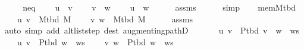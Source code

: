 \begin{isabellebody}
\endisataginvisible
{\isafoldinvisible}%
%
\isadeliminvisible
\isanewline
%
\endisadeliminvisible
%
\isadelimproof
%
\endisadelimproof
%
\isatagproof
{}\isamarkupfalse%
\ {\isacharminus}{\kern0pt}\isanewline
\ \ \isamarkupfalse%
\ neq{\isacharcolon}{\kern0pt}\isanewline
\ \ \ \ {\isachardoublequoteopen}u\ {\isasymnoteq}\ v{\isachardoublequoteclose}\isanewline
\ \ \ \ {\isachardoublequoteopen}v\ {\isasymnoteq}\ w{\isachardoublequoteclose}\isanewline
\ \ \ \ {\isachardoublequoteopen}u\ {\isasymnoteq}\ w{\isachardoublequoteclose}\isanewline
\ \ \ \ \isamarkupfalse%
\ assms{\isacharparenleft}{\kern0pt}{}{\isacharparenright}{\kern0pt}\isanewline
\ \ \ \ \isamarkupfalse%
\ simp{\isacharplus}{\kern0pt}\isanewline
\ \ \isamarkupfalse%
\ mem{\isacharunderscore}{\kern0pt}M{\isacharunderscore}{\kern0pt}tbd{\isacharcolon}{\kern0pt}\isanewline
\ \ \ \ {\isachardoublequoteopen}{\isacharbraceleft}{\kern0pt}u{\isacharcomma}{\kern0pt}\ v{\isacharbraceright}{\kern0pt}\ {\isasymnotin}\ M{\isacharunderscore}{\kern0pt}tbd\ M{\isachardoublequoteclose}\isanewline
\ \ \ \ {\isachardoublequoteopen}{\isacharbraceleft}{\kern0pt}v{\isacharcomma}{\kern0pt}\ w{\isacharbraceright}{\kern0pt}\ {\isasymin}\ M{\isacharunderscore}{\kern0pt}tbd\ M{\isachardoublequoteclose}\isanewline
\ \ \ \ \isamarkupfalse%
\ assms{\isacharparenleft}{\kern0pt}{}{\isacharparenright}{\kern0pt}\isanewline
\ \ \ \ \isamarkupfalse%
\ {\isacharparenleft}{\kern0pt}auto\ simp\ add{\isacharcolon}{\kern0pt}\ alt{\isacharunderscore}{\kern0pt}list{\isacharunderscore}{\kern0pt}step\ dest{\isacharcolon}{\kern0pt}\ augmenting{\isacharunderscore}{\kern0pt}pathD{\isacharparenleft}{\kern0pt}{}{\isacharparenright}{\kern0pt}{\isacharparenright}{\kern0pt}\isanewline
\ \ \isamarkupfalse%
\isanewline
\ \ \ \ {\isachardoublequoteopen}{\isacharbraceleft}{\kern0pt}u{\isacharcomma}{\kern0pt}\ v{\isacharbraceright}{\kern0pt}\ {\isasymnotin}\ P{\isacharunderscore}{\kern0pt}tbd\ {\isacharparenleft}{\kern0pt}v\ {\isacharhash}{\kern0pt}\ w\ {\isacharhash}{\kern0pt}\ ws{\isacharparenright}{\kern0pt}{\isachardoublequoteclose}\isanewline
\ \ \ \ {\isachardoublequoteopen}{\isacharbraceleft}{\kern0pt}u{\isacharcomma}{\kern0pt}\ v{\isacharbraceright}{\kern0pt}\ {\isasymnotin}\ P{\isacharunderscore}{\kern0pt}tbd\ {\isacharparenleft}{\kern0pt}w\ {\isacharhash}{\kern0pt}\ ws{\isacharparenright}{\kern0pt}{\isachardoublequoteclose}\isanewline
\ \ \ \ {\isachardoublequoteopen}{\isacharbraceleft}{\kern0pt}v{\isacharcomma}{\kern0pt}\ w{\isacharbraceright}{\kern0pt}\ {\isasymnotin}\ P{\isacharunderscore}{\kern0pt}tbd\ {\isacharparenleft}{\kern0pt}w\ {\isacharhash}{\kern0pt}\ ws{\isacharparenright}{\kern0pt}{\isachardoublequoteclose}\isanewline

\end{isabellebody}
